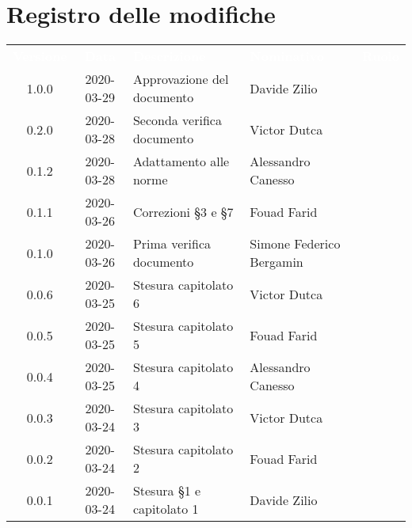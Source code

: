 
\section*{Registro delle modifiche}
{
	\centering
	\begin{longtable}{ c c  C{4cm}  C{3cm}  C{3.5cm} }
		\textcolor{white}{\textbf{Versione}} & \textcolor{white}{\textbf{Data}} & \textcolor{white}{\textbf{Descrizione}} & \textcolor{white}{\textbf{Nominativo}} & \textcolor{white}{\textbf{Ruolo}}\\
		1.0.0 & 2020-03-29 & Approvazione del documento & Davide Zilio &\RdP{}\\
		0.2.0 & 2020-03-28 & Seconda verifica documento & Victor Dutca &\ver{}\\	
		0.1.2 & 2020-03-28 & Adattamento alle norme & Alessandro Canesso &\ana{}\\
		0.1.1 & 2020-03-26 & Correzioni \S 3 e \S 7 & Fouad Farid &\ana{}\\	
		0.1.0 & 2020-03-26 & Prima verifica documento & Simone Federico Bergamin &\ver{}\\	
		0.0.6 & 2020-03-25 & Stesura capitolato 6 & Victor Dutca &\ana{}\\	
		0.0.5 & 2020-03-25 & Stesura capitolato 5 & Fouad Farid &\ana{}\\	
		0.0.4 & 2020-03-25 & Stesura capitolato 4 & Alessandro Canesso &\ana{}\\	
		0.0.3 & 2020-03-24 & Stesura capitolato 3 & Victor Dutca &\ana{}\\	
		0.0.2 & 2020-03-24 & Stesura capitolato 2 & Fouad Farid &\ana{}\\	
		0.0.1 & 2020-03-24 & Stesura \S 1 e capitolato 1 & Davide Zilio &\ana{}\\		
		
	\end{longtable}

}